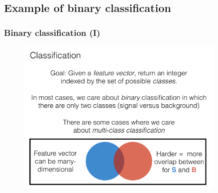 \documentclass[hyperref={colorlinks=true}]{beamer}
\begin{document}
\subsection[Example of binary classification]{Example of binary classification}

\begin{frame}%
  \frametitle{Binary classification (I)}

  \vspace{-0.0cm}

  \begin{figure}
    \centering 
    \includegraphics[width=0.9\textwidth,page=3]{ClassifierSlides.pdf}
  \end{figure}

    
\end{frame}

\end{document}
